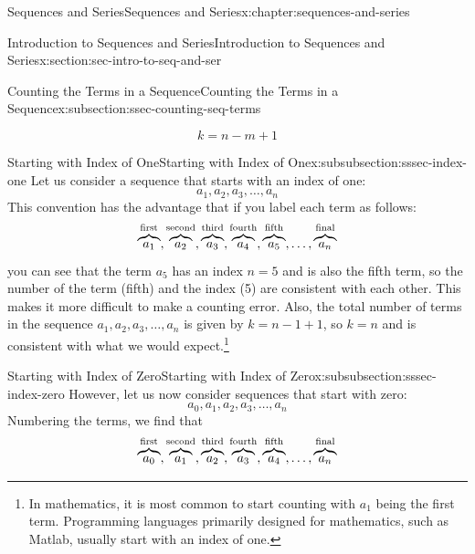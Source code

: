 \documentclass[twoside,10pt,]{book}
\numberwithin{equation}{section}
\begin{document}
\begin{chapterptx}{Sequences and Series}{}{Sequences and Series}{}{}{x:chapter:sequences-and-series}
\begin{sectionptx}{Introduction to Sequences and Series}{}{Introduction to Sequences and Series}{}{}{x:section:sec-intro-to-seq-and-ser}
\begin{subsectionptx}{Counting the Terms in a Sequence}{}{Counting the Terms in a Sequence}{}{}{x:subsection:ssec-counting-seq-terms}
\begin{introduction}{}
\begin{equation*}
k=n-m+1
\end{equation*}
\end{introduction}%
%
%
\typeout{************************************************}
\typeout{************************************************}
%
\begin{subsubsectionptx}{Starting with Index of One}{}{Starting with Index of One}{}{}{x:subsubsection:sssec-index-one}
Let us consider a sequence that starts with an index of one:%
\begin{equation*}
a_1, a_2, a_3, \ldots, a_n
\end{equation*}
This convention has the advantage that if you label each term as follows:%
\begin{equation*}
\overbrace {{a_1}}^{{\rm{first}}},\overbrace {{a_2}}^{{\rm{second}}},\overbrace {{a_3}}^{{\rm{third}}},\overbrace {{a_4}}^{{\rm{fourth}}},\overbrace {{a_5}}^{{\rm{fifth}}}, \ldots ,\overbrace {{a_n}}^{{\rm{final}}}
\end{equation*}
you can see that the term \(a_5\) has an index \(n=5\) and is also the fifth term, so the number of the term (fifth) and the index (5) are consistent with each other.  This makes it more difficult to make a counting error.  Also, the total number of terms in the sequence \(a_1, a_2, a_3, \ldots, a_n\) is given by \(k = n - 1 + 1\), so \(k = n\) and is consistent with what we would expect.\footnote{In mathematics, it is most common to start counting with \(a_1\) being the first term.  Programming languages primarily designed for mathematics, such as Matlab, usually start with an index of one.\label{g:fn:idp229902552}}%
\end{subsubsectionptx}
%
%
\typeout{************************************************}
\typeout{************************************************}
%
\begin{subsubsectionptx}{Starting with Index of Zero}{}{Starting with Index of Zero}{}{}{x:subsubsection:sssec-index-zero}
However, let us now consider sequences that start with zero:%
\begin{equation*}
a_0, a_1, a_2, a_3, \ldots, a_n
\end{equation*}
Numbering the terms, we find that%
\begin{equation*}
\overbrace {{a_0}}^{{\rm{first}}},\overbrace {{a_1}}^{{\rm{second}}},\overbrace {{a_2}}^{{\rm{third}}},\overbrace {{a_3}}^{{\rm{fourth}}},\overbrace {{a_4}}^{{\rm{fifth}}}, \ldots ,\overbrace {{a_n}}^{{\rm{final}}}

\end{equation*}
\end{subsubsectionptx}
\end{subsectionptx}
\end{sectionptx}
\end{chapterptx}
\end{document}
